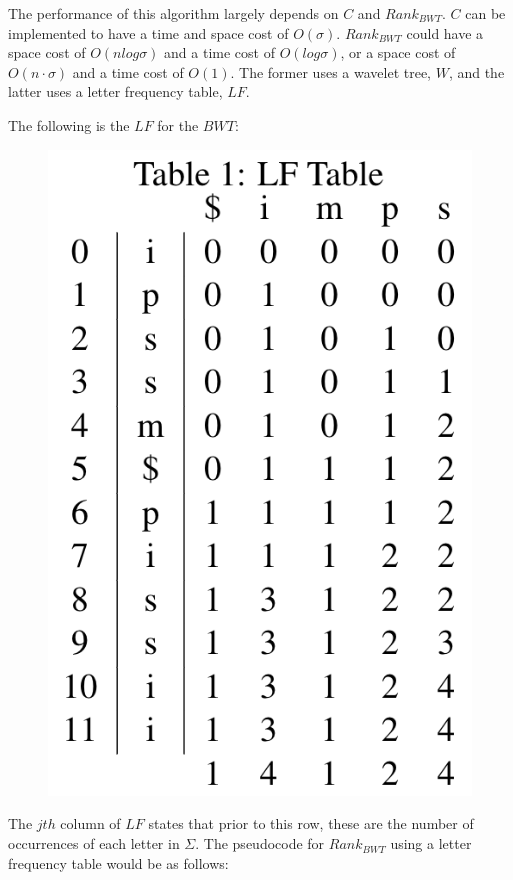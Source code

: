 \documentclass[11pt]{article}
\begin{document}
The performance of this algorithm largely depends on $C$ and $Rank_{BWT}$. $C$ can be implemented to have a time and space cost of $O(\sigma)$. $Rank_{BWT}$ could have a space cost of $O(nlog\sigma)$ and a time cost of $O(log\sigma)$, or a space cost of $O(n\cdot\sigma)$ and a time cost of $O(1)$. The former uses a wavelet tree, $W$, and the latter uses a letter frequency table, $LF$. 

The following is the $LF$ for the $BWT$:

\begin{figure}[h!]
\begin{center}
\includegraphics[scale=0.7]{Table1.png}
\label{fig:lf}
\end{center}
\end{figure}

The $jth$ column of $LF$ states that prior to this row, these are the number of occurrences of each letter in $\Sigma$. The pseudocode for $Rank_{BWT}$ using a letter frequency table would be as follows:
\end{document}
